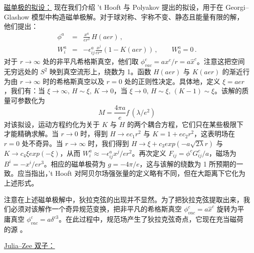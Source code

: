 \noindent\underline{磁单极的拟设：}
\noindent 现在我们介绍 't Hooft \cite{thooft} 与 Polyakov \cite{polya} 提出的拟设，用于在 Georgi–Glashow 模型中构造磁单极解。对于球对称、宇称不变、静态且能量有限的解，他们提出：
\begin{eqnarray}
\phi^a & = & \frac{x^a}{er^2}\,H(aer)\,,\nonumber\\
W^a_i&=&-\epsilon^a_{ij}\frac{x^j}{er^2}\left(1 - K(aer)\right)\,,
\qquad W^a_0= 0\,.
\label{tp-ansatz}
\end{eqnarray}
对于 $r\rightarrow\infty$ 处的非平凡希格斯真空，他们取 $\phi^c_{vac}=ax^c/r= a\hat{x}^c$。注意这把空间无穷远处的 $S^2$ 映到真空流形上，绕数为 1。函数 $H(aer)$ 与 $K(aer)$ 的渐近行为由 $r\rightarrow\infty$ 时的希格斯真空以及 $r=0$ 处的正则性决定。具体地，定义 $\xi=aer$，我们有：当 $\xi\rightarrow\infty,\,H\sim\xi,\, K\rightarrow 0$，当 $\xi\rightarrow 0,\, H\sim\xi,\,(K-1)\sim\xi$。该解的质量可参数化为
$$
M = \frac{4 \pi a}{e} f \, (\lambda /e^{2})
$$
对该拟设，运动方程约化为关于 $K$ 与 $H$ 的两个耦合方程，它们只在某些极限下才能精确求解。当 $r\rightarrow 0$ 时，得到 $H\rightarrow ec_1 r^2$ 与 $K=1+ec_2r^2$，这表明场在 $r=0$ 处不奇异。当 $r\rightarrow\infty$ 时，我们得到 $H\rightarrow\xi+c_3 exp(-a\sqrt{2\lambda}r)$ 与 $K\rightarrow c_4\xi exp(-\xi)$，从而 $W^a_i\approx-\epsilon^a_{ij}x^j/er^2$。再次定义 $F_{ij}=\phi^c G^c_{ij}/a$，磁场为 $B^{i} = - x^i/e r^3$。相应的磁单极荷为 $g=-4\pi/e$，这与该解的绕数为 1 所预期的一致。应当指出，'t Hooft 对阿贝尔场强张量的定义略有不同，但在大距离下它化为上述形式。

注意在上述磁单极解中，狄拉克弦的出现并不显然。为了把狄拉克弦提取出来，我们必须对该解作一个奇异规范变换，把非平凡的希格斯真空 $\phi^c_{vac}=a\hat{x}^c$ 旋转为平庸真空 $\phi^c_{vac}= a \delta^{c3}$。在此过程中，规范场产生了狄拉克弦奇点，它现在充当磁荷的源 \cite{thooft}。

\noindent\underline{Julia–Zee 双子：}

